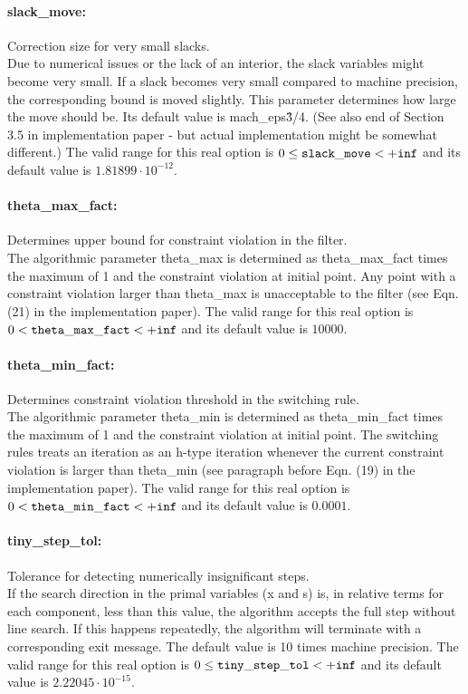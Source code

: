 \paragraph{slack\_move:}\label{sec:slack_move} Correction size for very small slacks. $\;$ \\
 Due to numerical issues or the lack of an
interior, the slack variables might become very
small.  If a slack becomes very small compared to
machine precision, the corresponding bound is
moved slightly.  This parameter determines how
large the move should be.  Its default value is
mach\_eps\^{3/4}.  (See also end of Section 3.5
in implementation paper - but actual
implementation might be somewhat different.) The valid range for this real option is 
$0 \le {\tt slack\_move } <  {\tt +inf}$
and its default value is $1.81899 \cdot 10^{-12}$.


\paragraph{theta\_max\_fact:}\label{sec:theta_max_fact} Determines upper bound for constraint violation in the filter. $\;$ \\
 The algorithmic parameter theta\_max is
determined as theta\_max\_fact times the maximum
of 1 and the constraint violation at initial
point.  Any point with a constraint violation
larger than theta\_max is unacceptable to the
filter (see Eqn. (21) in the implementation
paper). The valid range for this real option is 
$0 <  {\tt theta\_max\_fact } <  {\tt +inf}$
and its default value is $10000$.


\paragraph{theta\_min\_fact:}\label{sec:theta_min_fact} Determines constraint violation threshold in the switching rule. $\;$ \\
 The algorithmic parameter theta\_min is
determined as theta\_min\_fact times the maximum
of 1 and the constraint violation at initial
point.  The switching rules treats an iteration
as an h-type iteration whenever the current
constraint violation is larger than theta\_min
(see paragraph before Eqn. (19) in the
implementation paper). The valid range for this real option is 
$0 <  {\tt theta\_min\_fact } <  {\tt +inf}$
and its default value is $0.0001$.


\paragraph{tiny\_step\_tol:}\label{sec:tiny_step_tol} Tolerance for detecting numerically insignificant steps. $\;$ \\
 If the search direction in the primal variables
(x and s) is, in relative terms for each
component, less than this value, the algorithm
accepts the full step without line search.  If
this happens repeatedly, the algorithm will
terminate with a corresponding exit message. The
default value is 10 times machine precision. The valid range for this real option is 
$0 \le {\tt tiny\_step\_tol } <  {\tt +inf}$
and its default value is $2.22045 \cdot 10^{-15}$.


